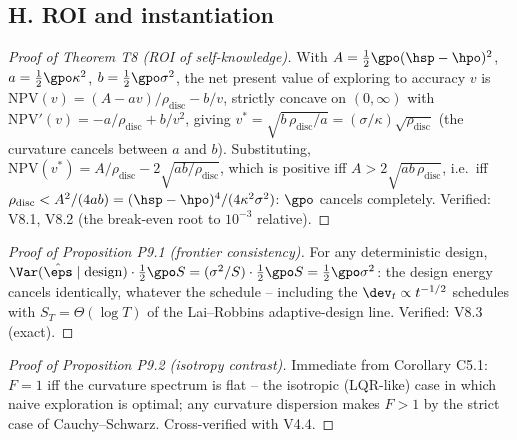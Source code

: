 \subsection*{H. ROI and instantiation}

\begin{proof}[Proof of Theorem T8 (ROI of self-knowledge)]
With $A = \tfrac{1}{2}\gpo(\hsp - \hpo)^2$, $a = \tfrac{1}{2}\gpo\kappa^2$,
$b = \tfrac{1}{2}\gpo\sigma^2$, the net present value of exploring to
accuracy $v$ is $\mathrm{NPV}(v) = (A - a v)/\rho_{\mathrm{disc}} - b/v$,
strictly concave on $(0,\infty)$ with
$\mathrm{NPV}'(v) = -a/\rho_{\mathrm{disc}} + b/v^2$, giving
$v^* = \sqrt{b\,\rho_{\mathrm{disc}}/a} =
(\sigma/\kappa)\sqrt{\rho_{\mathrm{disc}}}$ (the curvature cancels between
$a$ and $b$). Substituting, $\mathrm{NPV}(v^*) = A/\rho_{\mathrm{disc}} -
2\sqrt{ab/\rho_{\mathrm{disc}}}$, which is positive iff
$A > 2\sqrt{a b\,\rho_{\mathrm{disc}}}$, i.e.\ iff
$\rho_{\mathrm{disc}} < A^2/(4ab) = (\hsp - \hpo)^4/(4\kappa^2\sigma^2)$:
$\gpo$ cancels completely. Verified: V8.1, V8.2 (the break-even root to
$10^{-3}$ relative).
\end{proof}

\begin{proof}[Proof of Proposition P9.1 (frontier consistency)]
For any deterministic design, $\Var(\hat\eps\mid\mathrm{design}) \cdot
\tfrac{1}{2}\gpo S = (\sigma^2/S)\cdot\tfrac{1}{2}\gpo S =
\tfrac{1}{2}\gpo\sigma^2$: the design energy cancels identically, whatever
the schedule -- including the $\dev_t \propto t^{-1/2}$ schedules with
$S_T = \Theta(\log T)$ of the Lai--Robbins adaptive-design line. Verified:
V8.3 (exact).
\end{proof}

\begin{proof}[Proof of Proposition P9.2 (isotropy contrast)]
Immediate from Corollary C5.1: $F = 1$ iff the curvature spectrum is flat
-- the isotropic (LQR-like) case in which naive exploration is optimal;
any curvature dispersion makes $F > 1$ by the strict case of
Cauchy--Schwarz. Cross-verified with V4.4.
\end{proof}

